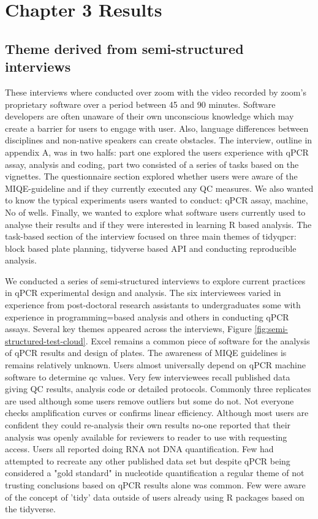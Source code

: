 \documentclass{SBCbookchapter}
\begin{document}
\section{Chapter 3 Results}

\subsection{Theme derived from semi-structured interviews}

These interviews where conducted over zoom with the video recorded by zoom's proprietary software over a period between 45 and 90 minutes. Software developers are often unaware of their own unconscious knowledge which may create a barrier for users to engage with user. Also, language differences between disciplines and non-native speakers can create obstacles.  The interview, outline in appendix A, was in two halfs: part one explored the users experience with qPCR assay, analysis and coding, part two consisted of a series of tasks based on the vignettes.  The questionnaire section explored whether users were aware of the MIQE-guideline and if they currently executed any QC measures. We also wanted to know the typical experiments users wanted to conduct: qPCR assay, machine, No of wells. Finally, we wanted to explore what software users currently used to analyse their results and if they were interested in learning R based analysis. The task-based section of the interview focused on three main themes of tidyqpcr: block based plate planning, tidyverse based API and conducting reproducible analysis.

We conducted a series of semi-structured interviews to explore current practices in qPCR experimental design and analysis.
The six interviewees varied in experience from post-doctoral research assistants to undergraduates some with experience in programming=based analysis and others in conducting qPCR assays.
Several key themes appeared across the interviews, Figure \ref{fig:semi-structured-test-cloud}.
Excel remains a common piece of software for the analysis of qPCR results and design of plates.
The awareness of MIQE guidelines is remains relatively unknown.
Users almost universally depend on qPCR machine software to determine qc values.
Very few interviewees recall published data giving QC results, analysis code or detailed protocols.
Commonly three replicates are used although some users remove outliers but some do not.
Not everyone checks amplification curves or confirms linear efficiency.
Although most users are confident they could re-analysis their own results no-one reported that their analysis was openly available for reviewers to reader to use with requesting access.
Users all reported doing RNA not DNA quantification.
Few had attempted to recreate any other published data set but despite qPCR being considered a "gold standard" in nucleotide quantification a regular theme of not trusting conclusions based on qPCR results alone was common. 
Few were aware of the concept of 'tidy' data outside of users already using R packages  based on the tidyverse.
\end{document}
